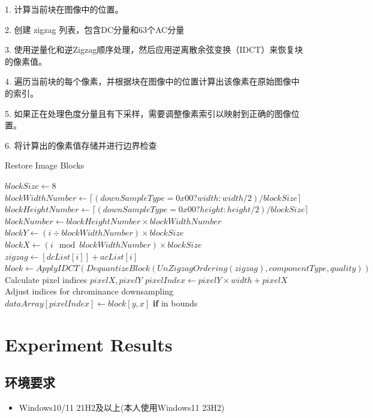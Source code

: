 \documentclass{article}
\begin{document}
1. 计算当前块在图像中的位置。

2. 创建 zigzag 列表，包含DC分量和63个AC分量

3. 使用逆量化和逆Zigzag顺序处理，然后应用逆离散余弦变换（IDCT）来恢复块的像素值。

4. 遍历当前块的每个像素，并根据块在图像中的位置计算出该像素在原始图像中的索引。

5. 如果正在处理色度分量且有下采样，需要调整像素索引以映射到正确的图像位置。

6. 将计算出的像素值存储并进行边界检查

\FloatBarrier
\begin{algorithm}
    \caption{Restore Image Blocks}
    \begin{algorithmic}[1] %
        \State $blockSize \gets 8$
        \State $blockWidthNumber \gets \lceil (downSampleType = 0x00 ? width : width / 2) / blockSize \rceil$
        \State $blockHeightNumber \gets \lceil (downSampleType = 0x00 ? height : height / 2) / blockSize \rceil$
        \State $blockNumber \gets blockHeightNumber \times blockWidthNumber$
            \State $blockY \gets (i \div blockWidthNumber) \times blockSize$
            \State $blockX \gets (i \mod blockWidthNumber) \times blockSize$
            \State $zigzag \gets [dcList[i]] + acList[i]$
            \State $block \gets ApplyIDCT(DequantizeBlock(UnZigzagOrdering(zigzag), componentType, quality))$
                \State Calculate pixel indices $pixelX, pixelY$
                \State $pixelIndex \gets pixelY \times width + pixelX$
                    \State Adjust indices for chrominance downsampling
                \EndIf
                \State $dataArray[pixelIndex] \gets block[y, x]$ \textbf{if} in bounds
            \EndFor
        \EndFor
    \EndProcedure
    \end{algorithmic}
\end{algorithm}
\FloatBarrier


\section{Experiment Results}

\subsection{环境要求}
\begin{itemize}
    \item Windows10/11 21H2及以上(本人使用Windows11 23H2)
\end{itemize}
\end{document}
